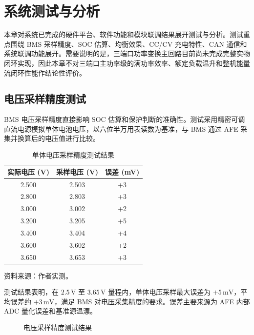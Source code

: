 
\section{系统测试与分析}

本章对系统已完成的硬件平台、软件功能和模块联调结果展开测试与分析。测试重点围绕 BMS 采样精度、SOC 估算、均衡效果、CC/CV 充电特性、CAN 通信和系统联调功能展开。需要说明的是，三端口功率变换主回路目前尚未完成完整实物闭环实现，因此本章不对三端口主功率级的满功率效率、额定负载温升和整机能量流闭环性能作结论性评价。

\subsection{电压采样精度测试}

BMS 电压采样精度直接影响 SOC 估算和保护判断的准确性。测试采用精密可调直流电源模拟单体电池电压，以六位半万用表读数为基准，与 BMS 通过 AFE 采集并换算后的电压值进行比较。

\begin{table}[htbp]
  \centering
  \caption{单体电压采样精度测试结果}
  \label{tab:voltage_accuracy}
  \begin{tabular}{@{}ccc@{}}
    \toprule
    \textbf{实际电压 (V)} & \textbf{采样电压 (V)} & \textbf{误差 (mV)} \\
    \midrule
    2.500 & 2.503 & +3 \\
    2.800 & 2.803 & +3 \\
    3.000 & 3.002 & +2 \\
    3.200 & 3.205 & +5 \\
    3.400 & 3.404 & +4 \\
    3.600 & 3.602 & +2 \\
    3.650 & 3.653 & +3 \\
    \bottomrule
  \end{tabular}
\end{table}
\vspace{-0.3em}
{\small 资料来源：作者实测。}

测试结果表明，在 $2.5\,\mathrm{V}$ 至 $3.65\,\mathrm{V}$ 量程内，单体电压采样最大误差为 $+5\,\mathrm{mV}$，平均误差约 $+3\,\mathrm{mV}$，满足 BMS 对电压采集精度的要求。误差主要来源为 AFE 内部 ADC 量化误差和基准源温漂。

\begin{figure}[htbp]
  \centering
  \caption{电压采样精度测试结果}
  \label{fig:voltage_accuracy}
\end{figure}


